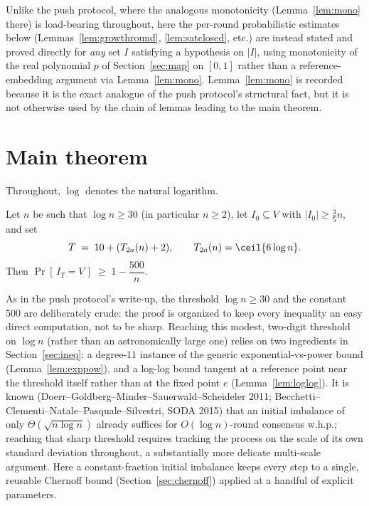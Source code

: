 \begin{remark}
  Unlike the push protocol, where the analogous monotonicity
  (Lemma~\ref{lem:mono} there) is load-bearing throughout, here the
  per-round probabilistic estimates below (Lemmas~\ref{lem:growthround},
  \ref{lem:satclosed}, etc.) are instead stated and proved directly for
  \emph{any} set $I$ satisfying a hypothesis on $|I|$, using monotonicity of
  the real polynomial $p$ of Section~\ref{sec:map} on $[0,1]$ rather than a
  reference-embedding argument via Lemma~\ref{lem:mono}. Lemma~\ref{lem:mono}
  is recorded because it is the exact analogue of the push protocol's
  structural fact, but it is not otherwise used by the chain of lemmas
  leading to the main theorem.
\end{remark}

\section{Main theorem}\label{sec:main-statement}

Throughout, $\log$ denotes the natural logarithm.

\begin{theorem}
  \label{thm:main}
  \leanok
  Let $n$ be such that $\log n \ge 30$ (in particular $n \ge 2$), let
  $I_0 \subseteq V$ with $|I_0| \ge \tfrac35 n$, and set
  \[
    T \;=\; 10 + (T_{2a}(n) + 2), \qquad T_{2a}(n) = \ceil{6\log n}.
  \]
  Then $\Pr[\, I_T = V \,] \;\ge\; 1 - \dfrac{500}{n}$.
\end{theorem}

\begin{remark}
  As in the push protocol's write-up, the threshold $\log n \ge 30$ and
  the constant $500$ are deliberately crude: the proof is organized to keep
  every inequality an easy direct computation, not to be sharp. Reaching
  this modest, two-digit threshold on $\log n$ (rather than an
  astronomically large one) relies on two ingredients in
  Section~\ref{sec:ineq}: a degree-$11$ instance of the generic
  exponential-vs-power bound (Lemma~\ref{lem:exppow}), and a log-log bound
  tangent at a reference point near the threshold itself rather than at the
  fixed point $e$ (Lemma~\ref{lem:loglog}). It is known
  (Doerr--Goldberg--Minder--Sauerwald--Scheideler 2011;
  Becchetti--Clementi--Natale--Pasquale--Silvestri, SODA 2015) that an
  initial imbalance of only $\Theta(\sqrt{n\log n})$ already suffices for
  $O(\log n)$-round consensus w.h.p.; reaching that sharp threshold
  requires tracking the process on the scale of its own standard deviation
  throughout, a substantially more delicate multi-scale argument. Here a
  constant-fraction initial imbalance keeps every step to a single,
  reusable Chernoff bound (Section~\ref{sec:chernoff}) applied at a handful
  of explicit parameters.
\end{remark}

